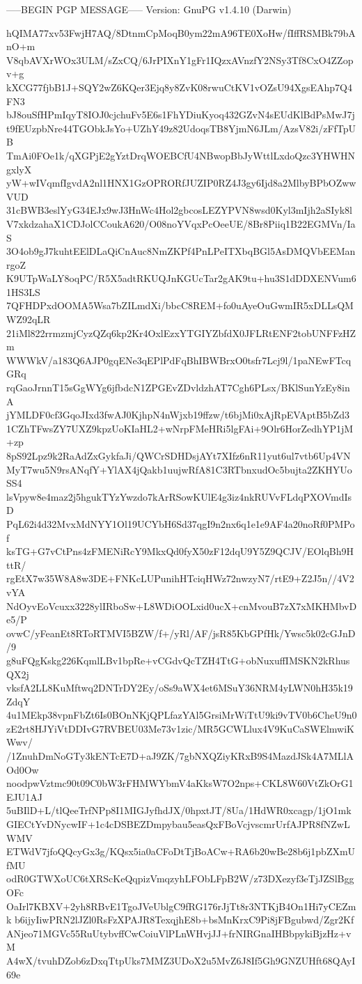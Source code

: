 -----BEGIN PGP MESSAGE-----
Version: GnuPG v1.4.10 (Darwin)

hQIMA77xv53FwjH7AQ/8DtnmCpMoqB0ym22mA96TE0XoHw/fIffRSMBk79bAnO+m
V8qbAVXrWOx3ULM/sZxCQ/6JrPIXnY1gFr1IQzxAVnzfY2NSy3Tf8CxO4ZZopv+g
kXCG77fjbB1J+SQY2wZ6KQer3Ejq8y8ZvK08rwuCtKV1vOZsU94XgsEAhp7Q4FN3
bJ8ouSfHPmIqyT8IOJ0cjchuFv5E6s1FhYDiuKyoq432GZvN4sEUdKlBdPsMwJ7j
t9fEUzpbNre44TGObkJsYo+UZhY49z82UdoqsTB8YjmN6JLm/AzsV82i/zFfTpUB
TmAi0FOe1k/qXGPjE2gYztDrqWOEBCfU4NBwopBbJyWttlLxdoQzc3YHWHNgxlyX
yW+wIVqmfIgvdA2nl1HNX1GzOPRORfJUZIP0RZ4J3gy6Ijd8a2MlbyBPbOZwwVUD
31cBWB3eslYyG34EJx9wJ3HnWc4Hol2gbcosLEZYPVN8wsd0Kyl3mIjh2aSIyk8l
V7xkdzahaX1CDJolCCoukA620/O08noYVqxPcOeeUE/8Br8Piiq1B22EGMVn/IaS
3O4ob9gJ7kuhtEElDLaQiCnAuc8NmZKPf4PnLPeITXbqBGl5AsDMQVbEEManrgoZ
K9UTpWaLY8oqPC/R5X5adtRKUQJnKGUcTar2gAK9tu+hu3S1dDDXENVum61HS3LS
7QFHDPxdOOMA5Wsa7bZILmdXi/bbcC8REM+fo0uAyeOuGwmIR5xDLLsQMWZ92qLR
21iMl822rrmzmjCyzQZq6kp2Kr4OxlEzxYTGIYZbfdX0JFLRtENF2tobUNFFzHZm
WWWkV/a183Q6AJP0gqENe3qEPlPdFqBhIBWBrxO0tsfr7Lcj9l/1paNEwFTcqGRq
rqGaoJrnnT15sGgWYg6jfbdcN1ZPGEvZDvldzhAT7Cgh6PLsx/BKlSunYzEy8inA
jYMLDF0cf3GqoJIxd3fwAJ0KjhpN4nWjxb19ffzw/t6bjMi0xAjRpEVAptB5bZd3
1CZhTFwsZY7UXZ9kpzUoKIaHL2+wNrpFMeHRi5lgFAi+9Olr6HorZedhYP1jM+zp
8pS92Lpz9k2RaAdZxGykfaJi/QWCrSDHDsjAYt7XIfz6nR11yut6ul7vtb6Up4VN
MyT7wu5N9rsANqfY+YlAX4jQakb1uujwRfA81C3RTbnxudOc5bujta2ZKHYUoSS4
lsVpyw8e4maz2j5hgukTYzYwzdo7kArRSowKUlE4g3iz4nkRUVvFLdqPXOVmdIsD
PqL62i4d32MvxMdNYY1Ol19UCYbH6Sd37qgI9n2nx6q1e1e9AF4a20noRf0PMPof
ksTG+G7vCtPns4zFMENiRcY9MkxQd0fyX50zF12dqU9Y5Z9QCJV/EOlqBh9HttR/
rgEtX7w35W8A8w3DE+FNKcLUPunihHTciqHWz72nwzyN7/rtE9+Z2J5n//4V2vYA
NdOyvEoVcuxx3228ylIRboSw+L8WDiOOLxid0ucX+cnMvouB7zX7xMKHMbvDe5/P
ovwC/yFeanEt8RToRTMVI5BZW/f+/yRl/AF/jsR85KbGPfHk/Ywsc5k02cGJnD/9
g8uFQgKskg226KqmlLBv1bpRe+vCGdvQcTZH4TtG+obNuxuffIMSKN2kRhusQX2j
vksfA2LL8KuMftwq2DNTrDY2Ey/oSs9aWX4et6MSuY36NRM4yLWN0hH35k19ZdqY
4u1MEkp38vpnFbZt6Is0BOnNKjQPLfazYAl5GrsiMrWiTtU9ki9vTV0b6CheU9n0
zE2rt8HJYiVtDDIvG7RVBEU03Me73v1zic/MR5GCWLlux4V9KuCaSWElmwiKWwv/
/1ZnuhDmNoGTy3kENTcE7D+aJ9ZK/7gbNXQZiyKRxB9S4MazdJSk4A7MLlAOd0Ow
noodpwVztmc90t09C0bW3rFHMWYbmV4aKksW7O2nps+CKL8W60VtZkOrG1EJU1AJ
5uBIlD+L/tlQeeTrfNPp8I1MIGJyfhdJX/0hpxtJT/8Ua/1HdWR0xcagp/1jO1mk
GIECtYvDNycwIF+1c4cDSBEZDmpybau5easQxFBoVcjvscmrUrfAJPR8fNZwLWMV
ETWdV7jfoQQcyGx3g/KQsx5ia0aCFoDtTjBoACw+RA6b20wBe28b6j1pbZXmUfMU
odR0GTWXoUC6tXRScKeQqpizVmqzyhLFObLFpB2W/z73DXezyf3eTjJZSlBggOFc
OaIrl7KBXV+2yh8RBvE1TgoJVeUblgC9fRG176rJjTt8r3NTKjB4On1Hi7yCEZmk
b6ijyIiwPRN2lJZl0RsFzXPAJR8TexqjhE8b+bsMnKrxC9Pi8jFBgubwd/Zgr2Kf
ANjeo71MGVc55RuUtybvffCwCoiuVlPLnWHvjJJ+frNIRGnaIHBbpykiBjzHz+vM
A4wX/tvuhDZob6zDxqTtpUks7MMZ3UDoX2u5MvZ6J8If5Gh9GNZUHft68QAyI69e
